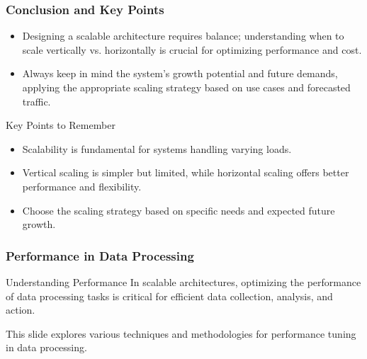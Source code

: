 \documentclass{beamer}
\begin{document}
\begin{frame}[fragile]
    \frametitle{Conclusion and Key Points}
    \begin{itemize}
        \item Designing a scalable architecture requires balance; understanding when to scale vertically vs. horizontally is crucial for optimizing performance and cost.
        \item Always keep in mind the system's growth potential and future demands, applying the appropriate scaling strategy based on use cases and forecasted traffic.
    \end{itemize}

    \begin{block}{Key Points to Remember}
        \begin{itemize}
            \item Scalability is fundamental for systems handling varying loads.
            \item Vertical scaling is simpler but limited, while horizontal scaling offers better performance and flexibility.
            \item Choose the scaling strategy based on specific needs and expected future growth.
        \end{itemize}
    \end{block}
\end{frame}

\begin{frame}[fragile]
    \frametitle{Performance in Data Processing}
    \begin{block}{Understanding Performance}
        In scalable architectures, optimizing the performance of data processing tasks is critical for efficient data collection, analysis, and action.
    \end{block}
    This slide explores various techniques and methodologies for performance tuning in data processing.
\end{frame}
\end{document}

